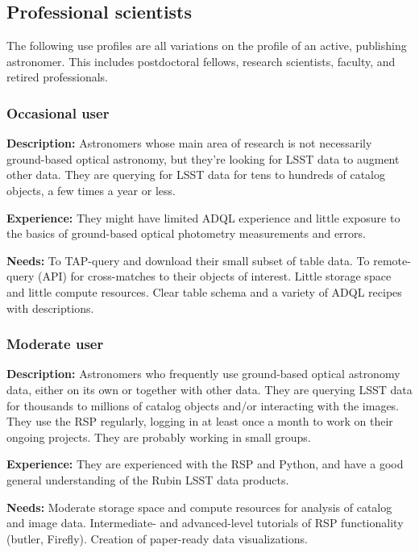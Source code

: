 \subsection{Professional scientists}

The following use profiles are all variations on the profile of an
active, publishing astronomer.
This includes postdoctoral fellows, research scientists, faculty, and
retired professionals. 

\subsubsection{Occasional user}

\textbf{Description:}
Astronomers whose main area of research is not necessarily ground-based
optical astronomy, but they're looking for LSST data to augment other data.
They are querying for LSST data for tens to hundreds of catalog objects, a few times 
a year or less.

\textbf{Experience:}
They might have limited ADQL experience and little exposure to the
basics of ground-based optical photometry measurements and errors.

\textbf{Needs:}
To TAP-query and download their small subset of table data.
To remote-query (API) for cross-matches to their objects of interest.
Little storage space and little compute resources.
Clear table schema and a variety of ADQL recipes with descriptions.

\subsubsection{Moderate user}

\textbf{Description:}
Astronomers who frequently use ground-based optical astronomy data, either on its own
or together with other data.
They are querying LSST data for thousands to millions of catalog objects and/or
interacting with the images.
They use the RSP regularly, logging in at least once a month to work on their
ongoing projects.
They are probably working in small groups.

\textbf{Experience:}
They are experienced with the RSP and Python, and have a good general understanding
of the Rubin LSST data products.

\textbf{Needs:}
Moderate storage space and compute resources for analysis of catalog and image data.
Intermediate- and advanced-level tutorials of RSP functionality (butler, Firefly).
Creation of paper-ready data visualizations.

